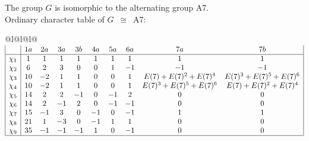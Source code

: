 \documentclass[varwidth=\maxdimen,border=10]{standalone}
\begin{document}
The group $G$ is isomorphic to the alternating group A7.\\
Ordinary character table of $G$\ $\cong$\ A7:\\
\begin{center}
\begin{tabular}{@{}l@{}l@{}l@{}}
\hline
\(\begin{array}{|l|ccccccccc|}
  & 1a & 2a & 3a & 3b & 4a & 5a & 6a & 7a & 7b\\ \hline
\chi_{1} & 1 & 1 & 1 & 1 & 1 & 1 & 1 & 1 & 1\\
\chi_{2} & 6 & 2 & 3 & 0 & 0 & 1 & -1 & -1 & -1\\
\chi_{3} & 10 & -2 & 1 & 1 & 0 & 0 & 1 & E(7)+E(7)^{2}+E(7)^{4} & E(7)^{3}+E(7)^{5}+E(7)^{6}\\
\chi_{4} & 10 & -2 & 1 & 1 & 0 & 0 & 1 & E(7)^{3}+E(7)^{5}+E(7)^{6} & E(7)+E(7)^{2}+E(7)^{4}\\
\chi_{5} & 14 & 2 & 2 & -1 & 0 & -1 & 2 & 0 & 0\\
\chi_{6} & 14 & 2 & -1 & 2 & 0 & -1 & -1 & 0 & 0\\
\chi_{7} & 15 & -1 & 3 & 0 & -1 & 0 & -1 & 1 & 1\\
\chi_{8} & 21 & 1 & -3 & 0 & -1 & 1 & 1 & 0 & 0\\
\chi_{9} & 35 & -1 & -1 & -1 & 1 & 0 & -1 & 0 & 0\\
\hline
\end{array}\)\\
\end{tabular}
\end{center}
\end{document}
